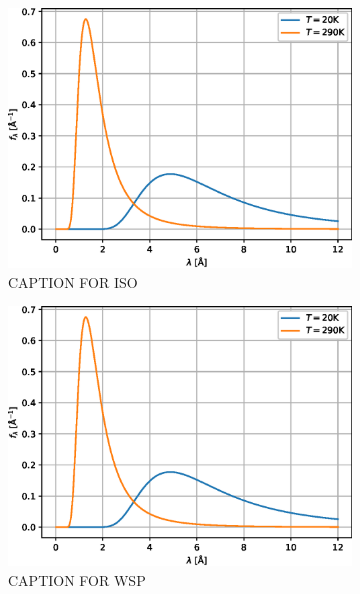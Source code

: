 \documentclass{article}
\begin{document}
\begin{figure}[htbp]
	\centering
	\begin{subfigure}[b]{0.3\textwidth}
		\centering
		\includegraphics[width=\textwidth]{source-spectrum}
		\caption{CAPTION FOR ISO}
		\label{fig:precession-devices:iso}
	\end{subfigure}
	\hfill
	\begin{subfigure}[b]{0.3\textwidth}
		\centering
		\includegraphics[width=\textwidth]{source-spectrum}
		\caption{CAPTION FOR WSP}
		\label{fig:precession-devices:wsp}
	\end{subfigure}
	\hfill
	\begin{subfigure}[b]{0.3\textwidth}
		\centering

\end{subfigure}
\end{figure}
\end{document}
